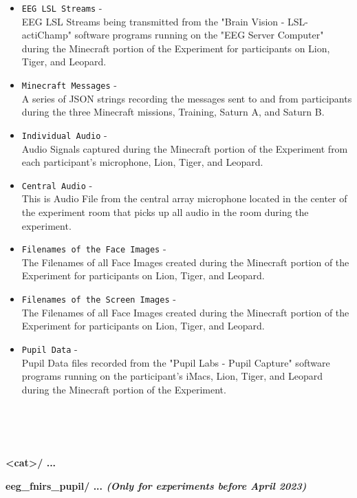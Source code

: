 \begin{description}
\begin{addmargin}[0em]{0em}
\begin{itemize}
        \item \verb|EEG LSL Streams| -\\EEG LSL Streams being transmitted from the "Brain Vision - LSL-actiChamp" software programs running on the "EEG Server Computer" during the Minecraft portion of the Experiment for participants on Lion, Tiger, and Leopard.
        \item \verb|Minecraft Messages| -\\A series of JSON strings recording the messages sent to and from participants during the three Minecraft missions, Training, Saturn A, and Saturn B.
        \item \verb|Individual Audio| -\\Audio Signals captured during the Minecraft portion of the Experiment from each participant's microphone, Lion, Tiger, and Leopard.
        \item \verb|Central Audio| -\\This is Audio File from the central array microphone located in the center of the experiment room that picks up all audio in the room during the experiment.
        \item \verb|Filenames of the Face Images| -\\The Filenames of all Face Images created during the Minecraft portion of the Experiment for participants on Lion, Tiger, and Leopard.
        \item \verb|Filenames of the Screen Images| -\\The Filenames of all Face Images created during the Minecraft portion of the Experiment for participants on Lion, Tiger, and Leopard.
        \item \verb|Pupil Data| -\\Pupil Data files recorded from the "Pupil Labs - Pupil Capture" software programs running on the participant's iMacs, Lion, Tiger, and Leopard during the Minecraft portion of the Experiment.
    \end{itemize}

\end{addmargin}



\textbf{\\\\\\}
\item\textbf{<cat>/ ...} %

\begin{addmargin}[0em]{0em} %
    \textbf{eeg\_fnirs\_pupil/ ... \textit{(Only for experiments before April 2023)}}


\end{addmargin}
\end{description}
